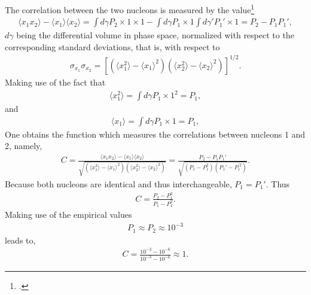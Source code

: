 The correlation between the two nucleons is measured by the value\footnote{\cite{Basdevant:05}.}
\begin{align}
\langle x_1x_2\rangle-\langle x_1\rangle\langle x_2\rangle=\int d \gamma P_2\times 1\times1-\int d \gamma P_1\times 1\int d \gamma' P_1'\times 1=P_2-P_1P_1',
\end{align}
$d\gamma$ being the differential volume in phase space, normalized with respect to the corresponding standard deviations, that is, with respect to
\begin{align}
\sigma_{x_1}\sigma_{x_2}=\left[\left(\langle x_1^2\rangle-\langle x_1\rangle^2\right)\left(\langle x_2^2\rangle-\langle x_2\rangle^2\right)\right]^{1/2}.
\end{align}
Making use of the fact that
\begin{align}
\langle x_1^2\rangle=\int d \gamma P_1\times 1^2=P_1,
\end{align}
and
\begin{align}
\langle x_1\rangle=\int d \gamma P_1\times 1=P_1,
\end{align}
One obtains the function which measures the correlations between nucleons 1 and 2, namely,
\begin{align}
C=\frac{\langle x_1x_2\rangle-\langle x_1\rangle\langle x_2\rangle}{\sqrt{\left(\langle x_1^2\rangle-\langle x_1\rangle^2\right)\left(\langle x_2^2\rangle-\langle x_2\rangle^2\right)}}=\frac{P_2-P_1P_1'}{\sqrt{\left(P_1-P_1^2\right)\left(P_1'-P_1^{'2}\right)}}.
\end{align}
Because both nucleons are identical and thus interchangeable, $P_1=P_1'$. Thus
\begin{align}
C=\frac{P_2-P_1^2}{P_1-P_1^2}.
\end{align}
Making use of the empirical values
\begin{align}
P_1\approx P_2\approx 10^{-3}
\end{align}
leads to,
\begin{align}\label{eq3.3.8}
C=\frac{10^{-3}-10^{-6}}{10^{-3}-10^{-6}}\approx 1.
\end{align}



